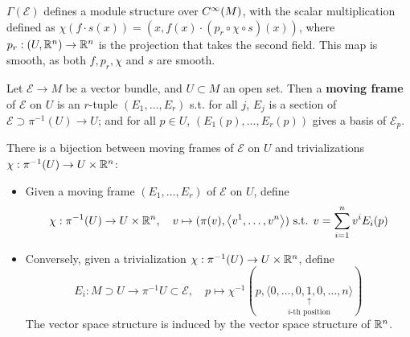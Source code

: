 \documentclass{article}
\begin{document}
\begin{remark}
    $\Gamma(\mathcal{E})$ defines a module structure over $C^{\infty}(M)$, with the scalar multiplication defined as $\chi(f \cdot s(x)) = (x, f(x) \cdot (p_r\circ \chi \circ s)(x))$, where $p_r: (U, \mathbb{R}^n) \to \mathbb{R}^n$ is the projection that takes the second field. This map is smooth, as both $f, p_r, \chi$ and $s$ are smooth. 
\end{remark}

\begin{definition}
    Let $\mathcal{E} \to M$ be a vector bundle, and $U \subset M$ an open set. Then a \textbf{moving frame} of $\mathcal{E}$ on $U$ is an $r$-tuple $(E_1, \dots, E_r)$ s.t. for all $j$, $E_j$ is a section of $\mathcal{E} \supset \pi^{-1}(U) \to U$; and for all $p \in U$, $(E_1(p), \dots, E_r(p))$ gives a basis of $\mathcal{E}_p$.
\end{definition}

\begin{remark}
    There is a bijection between moving frames of $\mathcal{E}$ on $U$ and trivializations $\chi: \pi^{-1}(U) \to U \times \mathbb{R}^n$:
    \begin{itemize}
        \item Given a moving frame $(E_1, \dots, E_r)$ of $\mathcal{E}$ on $U$, define
        \[
            \chi: \pi^{-1}(U) \to U \times \mathbb{R}^n, \quad v \mapsto (\pi(v), \left\langle v^1, \dots, v^n \right\rangle) \text{ s.t. } v = \sum_{i = 1}^n v^i E_i(p)
        \]
        \item Conversely, given a trivialization $\chi: \pi^{-1}(U) \to U \times \mathbb{R}^n$, define
        \[
            E_i: M \supset U \to \pi^{-1}U \subset \mathcal{E}, \quad p \mapsto \chi^{-1}(p, \langle 0, \underset{i\text{-th position}}{\underset{\uparrow}{\dots, 0, 1, 0, \dots}}, n\rangle)
        \]
        The vector space structure is induced by the vector space structure of $\mathbb{R}^n$.
    \end{itemize}
\end{remark}
\end{document}
